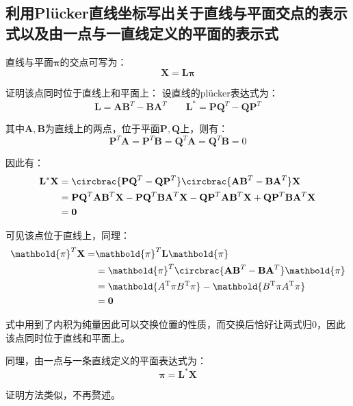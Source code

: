 \documentclass[11pt]{article}
\begin{document}
\subsection{利用Plücker直线坐标写出关于直线与平面交点的表示式以及由一点与一直线定义的平面的表示式}
直线与平面$\mathbold{\pi}$的交点可写为：
\begin{equation*}
  \mathbold{X}=\mathbold{L}\mathbold{\pi}
\end{equation*}\par
证明该点同时位于直线上和平面上：
设直线的plücker表达式为：
\begin{equation*}
  \mathbold{L}=\mathbf{AB}^T-\mathbf{BA}^T\qquad\mathbf{L}^*=\mathbf{PQ}^T-\mathbf{QP}^T
\end{equation*}\par
其中$\mathbf{A,B}$为直线上的两点，位于平面$\mathbf{P,Q}$上，则有：
\begin{equation*}
  \mathbf{P}^T\mathbf{A}=\mathbf{P}^T\mathbf{B}=\mathbf{Q}^T\mathbf{A}=\mathbf{Q}^T\mathbf{B}=0
\end{equation*}\par
因此有：
\begin{align*}
  \mathbf{L^*X} & =\circbrac{\mathbf{PQ}^T-\mathbf{QP}^T}\circbrac{\mathbf{AB}^T-\mathbf{BA}^T}\mathbf{X}                                                              \\
                & =\mathbf{PQ}^T\mathbf{AB}^T\mathbf{X}-\mathbf{PQ}^T\mathbf{BA}^T\mathbf{X}-\mathbf{QP}^T\mathbf{AB}^T\mathbf{X}+\mathbf{QP}^T\mathbf{BA}^T\mathbf{X} \\
                & =\mathbf{0}
\end{align*}\par
可见该点位于直线上，同理：
\begin{align*}
  \mathbold{\pi}^T\mathbf{X}= & \mathbold{\pi}^T\mathbf{L}\mathbold{\pi}                                               \\
                              & =\mathbold{\pi}^T\circbrac{\mathbf{AB}^T-\mathbf{BA}^T}\mathbold{\pi}                  \\
                              & =\mathbold{A^\mathrm{T}\pi B^\mathrm{T}\pi}-\mathbold{B^\mathrm{T}\pi A^\mathrm{T}\pi} \\
                              & =\mathbf{0}
\end{align*}\par
式中用到了内积为纯量因此可以交换位置的性质，而交换后恰好让两式归0，因此该点同时位于直线和平面上。\par
同理，由一点与一条直线定义的平面表达式为：
\begin{equation*}
  \mathbold{\pi}=\mathbold{L^*}\mathbold{X}
\end{equation*}\par
证明方法类似，不再赘述。
\end{document}
